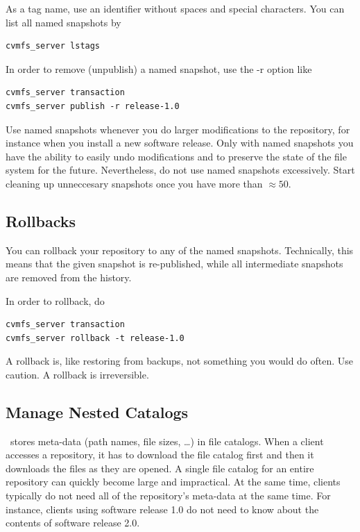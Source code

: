 As a tag name, use an identifier without spaces and special characters. 
You can list all named snapshots by 
\begin{verbatim}
cvmfs_server lstags
\end{verbatim}

In order to remove (unpublish) a named snapshot, use the -r option like
\begin{verbatim}
cvmfs_server transaction
cvmfs_server publish -r release-1.0
\end{verbatim}

Use named snapshots whenever you do larger modifications to the repository, for instance when you install a new software release. 
Only with named snapshots you have the ability to easily undo modifications and to preserve the state of the file system for the future. 
Nevertheless, do not use named snapshots excessively. 
Start cleaning up unneccesary snapshots once you have more than $\approx 50$.

\subsection{Rollbacks}

You can rollback your repository to any of the named snapshots. 
Technically, this means that the given snapshot is re-published, while all intermediate snapshots are removed from the history.

In order to rollback, do
\begin{verbatim}
cvmfs_server transaction
cvmfs_server rollback -t release-1.0
\end{verbatim}

A rollback is, like restoring from backups, not something you would do often. 
Use caution. 
A rollback is irreversible.

\subsection{Manage Nested Catalogs}

\cvmfs\ stores meta-data (path names, file sizes, \dots) in file catalogs. 
When a client accesses a repository, it has to download the file catalog first and then it downloads the files as they are opened. 
A single file catalog for an entire repository can quickly become large and impractical. 
At the same time, clients typically do not need all of the repository's meta-data at the same time. 
For instance, clients using software release 1.0 do not need to know about the contents of software release 2.0.

